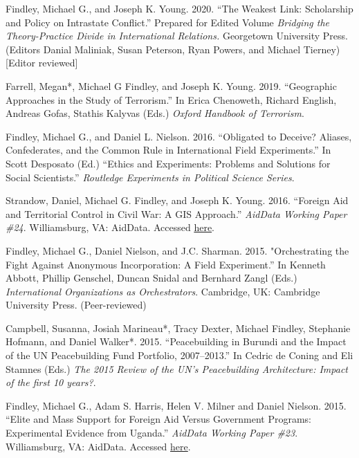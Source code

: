\documentclass[10pt]{article}
\begin{document}
\begin{etaremune}

\item Findley, Michael G., and Joseph K. Young. 2020. ``The Weakest Link: Scholarship and Policy on Intrastate Conflict.'' Prepared for Edited Volume \textit{Bridging the Theory-Practice Divide in International Relations.} Georgetown University Press. (Editors Danial Maliniak, Susan Peterson, Ryan Powers, and Michael Tierney)  [Editor reviewed]

\item Farrell, Megan*, Michael G Findley, and Joseph K. Young. 2019. ``Geographic Approaches in the Study of Terrorism.'' In Erica Chenoweth, Richard English, Andreas Gofas, Stathis Kalyvas (Eds.) \textit{Oxford Handbook of Terrorism}.

\item Findley, Michael G., and Daniel L. Nielson. 2016. ``Obligated to Deceive? Aliases, Confederates, and the Common Rule in International Field Experiments.'' In Scott Desposato (Ed.) ``Ethics and Experiments: Problems and Solutions for Social Scientists.'' \textit{Routledge Experiments in Political Science Series}.

\item Strandow, Daniel, Michael G. Findley, and Joseph K. Young. 2016. ``Foreign Aid and Territorial Control in Civil War: A GIS Approach.'' \textit{AidData Working Paper \#24}. Williamsburg, VA: AidData. Accessed \href{http://docs.aiddata.org/ad4/pdfs/wps24_foreign_aid_and_the_intensity_of_violent_armed_conflict.pdf}{here}.

\item Findley, Michael G., Daniel Nielson, and J.C. Sharman. 2015. "Orchestrating the Fight Against Anonymous Incorporation: A Field Experiment.'' In Kenneth Abbott, Phillip Genschel, Duncan Snidal and Bernhard Zangl (Eds.)  \textit{International Organizations as Orchestrators}. Cambridge, UK: Cambridge University Press. (Peer-reviewed)

\item Campbell, Susanna, Josiah Marineau*, Tracy Dexter, Michael Findley, Stephanie Hofmann, and Daniel Walker*. 2015. ``Peacebuilding in Burundi and the Impact of the UN Peacebuilding Fund Portfolio, 2007--2013.'' In Cedric de Coning and Eli Stamnes (Eds.) \textit{The 2015 Review of the UN's Peacebuilding Architecture: Impact of the first 10 years?}. 

\item Findley, Michael G., Adam S. Harris, Helen V. Milner and Daniel Nielson. 2015. ``Elite and Mass Support for Foreign Aid Versus Government Programs: Experimental Evidence from Uganda.'' \textit{AidData Working Paper \#23}. Williamsburg, VA: AidData. Accessed \href{http://aiddata.org/aiddata-working-paper-series}{here}.


\end{etaremune}
\end{document}
